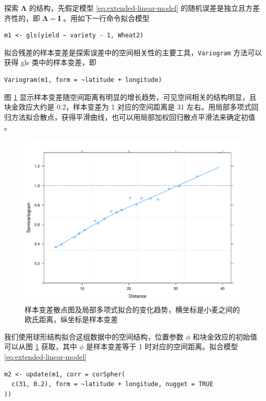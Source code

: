 \documentclass[12pt,a4paper,UTF8,twoside]{book}
\theoremstyle{definition}
\theoremstyle{definition}
\theoremstyle{definition}
\theoremstyle{remark}
\begin{document}
探索 \(\boldsymbol{\Lambda}\) 的结构，先假定模型
\eqref{eq:extended-linear-model} 的随机误差是独立且方差齐性的，即
\(\boldsymbol{\Lambda} = \boldsymbol{I}\) 。用如下一行命令拟合模型

\begin{verbatim}
m1 <- gls(yield ~ variety - 1, Wheat2)
\end{verbatim}

拟合残差的样本变差是探索误差中的空间相关性的主要工具，\texttt{Variogram}
方法可以获得 gls 类中的样本变差，即

\begin{verbatim}
Variogram(m1, form = ~latitude + longitude)
\end{verbatim}

图 \ref{fig:yields-variogram}
显示样本变差随空间距离有明显的增长趋势，可见空间相关的结构明显，且块金效应大约是
0.2，样本变差为 1 对应的空间距离是 31
左右。用局部多项式回归方法拟合散点，获得平滑曲线，也可以用局部加权回归散点平滑法来确定初值
\citep{Xie2008COS}。

\begin{figure}

{\centering \includegraphics[width=0.7\linewidth]{figures/Yields-Variogram} 

}

\caption{样本变差散点图及局部多项式拟合的变化趋势，横坐标是小麦之间的欧氏距离，纵坐标是样本变差}\label{fig:yields-variogram}
\end{figure}

我们使用球形结构拟合这组数据中的空间结构，位置参数 \(\phi\)
和块金效应的初始值可以从图 \ref{fig:yields-variogram} 获取，其中
\(\phi\) 是样本变差等于 1 时对应的空间距离。拟合模型
\eqref{eq:extended-linear-model}

\begin{verbatim}
m2 <- update(m1, corr = corSpher(
  c(31, 0.2), form = ~latitude + longitude, nugget = TRUE
))
\end{verbatim}
\end{document}
